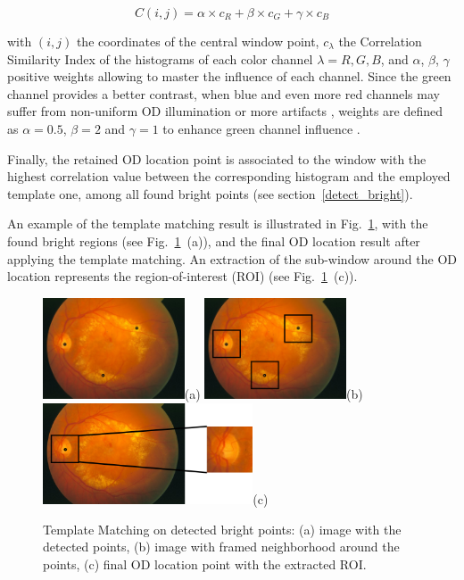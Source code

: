 \begin{equation}
C(i,j) = \alpha \times c_R + \beta \times c_G + \gamma \times c_B
\label{corr2}
\end{equation}

\noindent with $(i,j)$ the coordinates of the central window point, $c_{\lambda}$ the Correlation Similarity Index of the histograms of each color channel $\lambda = R, G, B$, and $\alpha$, $\beta$, $\gamma$ positive weights allowing to master the influence of each channel. Since the green channel provides a better contrast, when blue and even more red channels may suffer from non-uniform OD illumination or more artifacts \citep{hashim}, weights are defined as $\alpha = 0.5$, $\beta = 2$ and $\gamma = 1$ to enhance green channel influence \citep{dehghani}. 

Finally, the retained OD location point is associated to the window with the highest correlation value between the corresponding histogram and the employed template one, among all found bright points (see \mbox{section \ref{detect_bright}}).

An example of the template matching result is illustrated in \mbox{Fig. \ref{exemple_tm}}, with the found bright regions (see \mbox{Fig. \ref{exemple_tm} (a)}), and the final OD location result after applying the template matching. An extraction of the sub-window around the OD location represents the region-of-interest (ROI) (see \mbox{Fig. \ref{exemple_tm} (c)}).

\bigbreak

\begin{figure}[h]
    \centering
    \includegraphics[height=3cm]{Images/Methode/Detection/im0002/points.jpg}{(a)}
    \includegraphics[height=3cm]{Images/Methode/Detection/im0002/framed_points2.png}{(b)}
    \includegraphics[height=3cm]{Images/Methode/Detection/im0002/final_crop.png}{(c)}
    \caption{\label{exemple_tm}Template Matching on detected bright points: (a) image with the detected points, (b) image with framed neighborhood around the points, (c) final OD location point with the extracted ROI.}
\end{figure}

